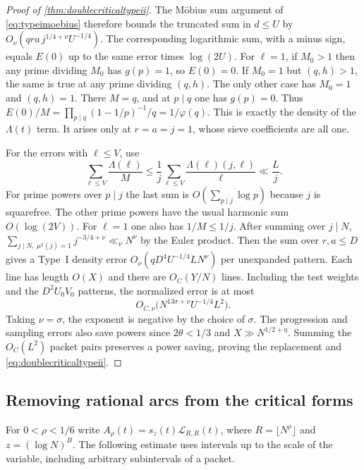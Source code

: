 \documentclass[11pt,a4paper]{article}
\numberwithin{equation}{section}
\begin{document}
\begin{proof}[Proof of \cref{thm:doublecriticaltypeii}]
The M\"obius sum argument of \cref{eq:typeimoebius}
therefore bounds the truncated sum in $d\le U$ by
$O_\nu(qra\,j^{1/4+\nu}U^{-1/4})$. The corresponding
logarithmic sum, with a minus sign, equals $E(0)$
up to the same error times $\log(2U)$.
For $\ell=1$, if $M_0>1$ then any prime dividing $M_0$
has $g(p)=1$, so $E(0)=0$. If $M_0=1$ but
$(q,h)>1$, the same is true at any prime dividing
$(q,h)$. The only other case has $M_0=1$ and $(q,h)=1$.
There $M=q$, and at $p\mid q$ one has $g(p)=0$.
Thus $E(0)/M=\prod_{p\mid q}(1-1/p)^{-1}/q
=1/\varphi(q)$. This is exactly the density of the
$\Lambda(t)$ term. It arises only at $r=a=j=1$,
whose sieve coefficients are all one.

For the errors with $\ell\le V$, use
\[
 \sum_{\ell\le V}\frac{\Lambda(\ell)}{M}
   \le \frac1j\sum_{\ell\le V}
                  \frac{\Lambda(\ell)(j,\ell)}{\ell}
   \ll \frac{L}{j}.
\]
For prime powers over $p\mid j$ the last sum is
$O(\sum_{p\mid j}\log p)$ because $j$ is squarefree.
The other prime powers have the usual harmonic sum
$O(\log(2V))$. For $\ell=1$ one also has $1/M\le1/j$.
After summing over $j\mid N$,
$\sum_{j\mid N,\ \mu^2(j)=1} j^{-3/4+\nu}\ll_\nu N^\nu$
by the Euler product. Then the sum over $r,a\le D$
gives a Type~I density error
$O_\nu(q D^4 U^{-1/4} L N^\nu)$ per unexpanded
pattern. Each line has length $O(X)$ and there
are $O_C(Y/N)$ lines. Including the test weights and
the $D^2U_0V_0$ patterns, the normalized error is at most
\[
 O_{C,\nu}\bigl(N^{13\sigma+\nu}U^{-1/4}L^2\bigr).
\]
Taking $\nu=\sigma$, the exponent is negative by
the choice of $\sigma$. The progression and sampling
errors also save powers since $2\theta<1/3$ and
$X\gg N^{1/2+\eta}$. Summing the $O_C(L^2)$ packet
pairs preserves a power saving, proving the replacement
and \cref{eq:doublecriticaltypeii}.
\end{proof}

\subsection{Removing rational arcs from the critical forms}

For $0<\rho<1/6$ write
$A_\rho(t)=s_z(t)\mathcal L_{R,R}(t)$, where
$R=\lfloor N^\rho\rfloor$ and $z=(\log N)^B$.
The following estimate uses intervals up to the scale of
the variable, including arbitrary subintervals of a packet.
\end{document}

